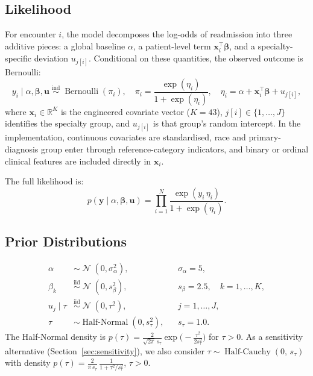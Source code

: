 \documentclass[10pt]{article}
\newcommand{\bx}{\bm{x}}
\newcommand{\by}{\bm{y}}
\newcommand{\bbeta}{\bm{\beta}}
\newcommand{\bu}{\bm{u}}
\newcommand{\iid}{\overset{\text{iid}}{\sim}}
\newcommand{\ind}{\overset{\text{ind}}{\sim}}
\DeclareMathOperator{\Bernoulli}{Bernoulli}
\DeclareMathOperator{\Normal}{\mathcal{N}}
\DeclareMathOperator{\HalfNormal}{Half\text{-}Normal}
\DeclareMathOperator{\HalfCauchy}{Half\text{-}Cauchy}
\begin{document}
\subsection{Likelihood}

For encounter $i$, the model decomposes the log-odds of readmission into
three additive pieces: a global baseline $\alpha$, a patient-level term
$\bx_i^\top \bbeta$, and a specialty-specific deviation $u_{j[i]}$.
Conditional on these quantities, the observed outcome is Bernoulli:
\begin{equation}
  y_i \mid \alpha, \bbeta, \bu \;\ind\;
  \Bernoulli(\pi_i), \quad
  \pi_i = \frac{\exp(\eta_i)}{1 + \exp(\eta_i)}, \quad
  \eta_i = \alpha + \bx_i^\top \bbeta + u_{j[i]},
\end{equation}
where $\bx_i \in \mathbb{R}^{K}$ is the engineered covariate vector
($K = 43$), $j[i] \in \{1,\dots,J\}$ identifies the specialty group, and
$u_{j[i]}$ is that group's random intercept.  In the implementation,
continuous covariates are standardised, race and primary-diagnosis group
enter through reference-category indicators, and binary or ordinal clinical
features are included directly in $\bx_i$.

The full likelihood is:
\begin{equation}
  p(\by \mid \alpha, \bbeta, \bu)
  = \prod_{i=1}^{N} \frac{\exp(y_i\,\eta_i)}{1 + \exp(\eta_i)}.
\end{equation}

\subsection{Prior Distributions}

\begin{align}
  \alpha &\sim \Normal(0, \sigma_\alpha^2), && \sigma_\alpha = 5, \\
  \beta_k &\iid \Normal(0, s_\beta^2), && s_\beta = 2.5, \quad k = 1,\dots,K, \\
  u_j \mid \tau &\iid \Normal(0, \tau^2), && j = 1,\dots,J, \\
  \tau &\sim \HalfNormal(0, s_\tau^2), && s_\tau = 1.0.
\end{align}
The Half-Normal density is
$p(\tau) = \frac{2}{\sqrt{2\pi}\,s_\tau}\exp\!\bigl(-\tfrac{\tau^2}{2s_\tau^2}\bigr)$
for $\tau > 0$.
As a sensitivity alternative (Section~\ref{sec:sensitivity}), we also consider
$\tau \sim \HalfCauchy(0,\,s_\tau)$ with density
$p(\tau) = \frac{2}{\pi\,s_\tau}\,\frac{1}{1 + \tau^2/s_\tau^2}$, $\tau > 0$.
\end{document}
